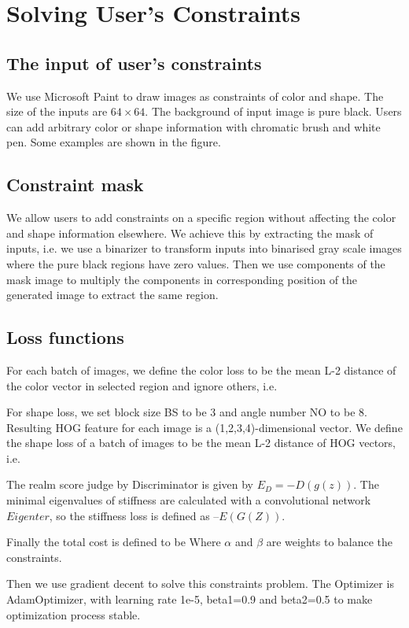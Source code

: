 \section{Solving User's Constraints}
\subsection{The input of user's constraints}

We use Microsoft Paint to draw images as constraints of color and shape. The size of the inputs are $64\times64$. The background of input image is pure black. Users can add arbitrary color or shape information with chromatic brush and white pen. Some examples are shown in the figure.

\subsection{Constraint mask}

We allow users to add constraints on a specific region without affecting the color and shape information elsewhere. We achieve this by extracting the mask of inputs, i.e. we use a binarizer to transform inputs into binarised gray scale images where the pure black regions have zero values. Then we use components of the mask image to multiply the components in corresponding position of the generated image to extract the same region. 

\subsection{Loss functions}

For each batch of images, we define the color loss to be the mean L-2 distance of the color vector in selected region and ignore others, i.e.

For shape loss, we set block size BS to be 3 and angle number NO to be 8. Resulting HOG feature for each image is a (1,2,3,4)-dimensional vector. We define the shape loss of a batch of images to be the mean L-2 distance of HOG vectors, i.e.

The realm score judge by Discriminator is given by $E_D = -D(g(z))$. The minimal eigenvalues of stiffness are calculated with a convolutional network $Eigenter$, so the stiffness loss is defined as $–E(G(Z))$.

Finally the total cost is defined to be
Where $\alpha$ and $\beta$ are weights to balance the constraints.

Then we use gradient decent to solve this constraints problem. The Optimizer is AdamOptimizer, with learning rate 1e-5, beta1=0.9 and beta2=0.5 to make optimization process stable.
